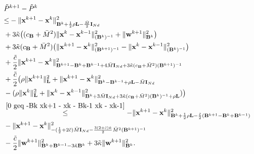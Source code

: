 \documentclass[10pt,a4paper]{amsart}
\begin{document}
\begin{align}
	&\tilde{P}^{k+1}-\tilde{P}^{k}\notag\\
	&{\leq} -\|\mathbf{x}^{k+1}-\mathbf{x}^{k}\|^2_{\mathbf{B}^{k}+\frac{1}{2}\rho \mathbf{L} -\frac{\bar{M}}{2}\mathbf{I}_{Nd}}\notag\\
    &+3\tilde{\kappa} \big((c_{\mathbf{B}}+\bar{M}^2)\|\mathbf{x}^{k}-\mathbf{x}^{k-1}\|^2_{(\mathbf{B}^k)^{-1}}+\|\mathbf{w}^{k+1}\|^2_{\mathbf{B}^k}\big)\notag\\
	&+3\tilde{\kappa} (c_{\mathbf{B}}+\bar{M}^2)\big(\|\mathbf{x}^{k+1}-\mathbf{x}^{k}\|^2_{(\mathbf{B}^{k+1})^{-1}}-\|\mathbf{x}^{k}-\mathbf{x}^{k-1}\|^2_{(\mathbf{B}^k)^{-1}}\big)\notag\\
	&+\frac{\tilde{c}}{2}\|\mathbf{x}^{k+1}-\mathbf{x}^{k}\|^2_{\mathbf{B}^{k+1}-\mathbf{B}^k+\mathbf{B}^{k-1}+4\bar{M}\mathbf{I}_{Nd}+3\tilde{\kappa} (c_{\mathbf{B}}+\bar{M}^2)(\mathbf{B}^{k+1})^{-1}}\notag\\
	&+\frac{\tilde{c}}{2}\big(\rho\|\mathbf{x}^{k+1}\|^2_\mathbf{L}+\|\mathbf{x}^{k+1}-\mathbf{x}^k\|^2_{\mathbf{B}^k-\mathbf{B}^{k-1}+\rho \mathbf{L}-\bar{M}\mathbf{I}_{Nd}}\notag\\
    &-(\rho \|\mathbf{x}^k\|^2_\mathbf{L}+\|\mathbf{x}^k-\mathbf{x}^{k-1}\|^2_{\mathbf{B}^k+3\bar{M}\mathbf{I}_{Nd}+3\tilde{\kappa} (c_{\mathbf{B}}+\bar{M}^2)(\mathbf{B}^k)^{-1}+\rho \mathbf{L}})\big)\notag\\
	& \overset{\eqref{0 geq -Bk xk+1 - xk - Bk-1 xk - xk-1}}{\leq}-\|\mathbf{x}^{k+1}-\mathbf{x}^{k}\|^2_{\mathbf{B}^k+\frac{1}{2}\rho \mathbf{L} -\frac{\tilde{c}}{2}(\mathbf{B}^{k+1}-\mathbf{B}^k+\mathbf{B}^{k-1})}\notag\\
    &-\|\mathbf{x}^{k+1}-\mathbf{x}^{k}\|^2_{-(\frac{1}{2}+2\tilde{c})\bar{M}\mathbf{I}_{Nd}-\frac{3(2+\tilde{c})\tilde{\kappa}}{2} \bar{M}^2(\mathbf{B}^{k+1})^{-1}}\notag\\
	&-\frac{\tilde{c}}{2}\|\mathbf{w}^{k+1}\|^2_{\mathbf{B}^k+\mathbf{B}^{k-1}-3\tilde{\kappa}\mathbf{B}^k}+3\tilde{\kappa}\|\mathbf{w}^{k+1}\|^2_{\mathbf{B}^k}.\notag
\end{align}
\end{document}
